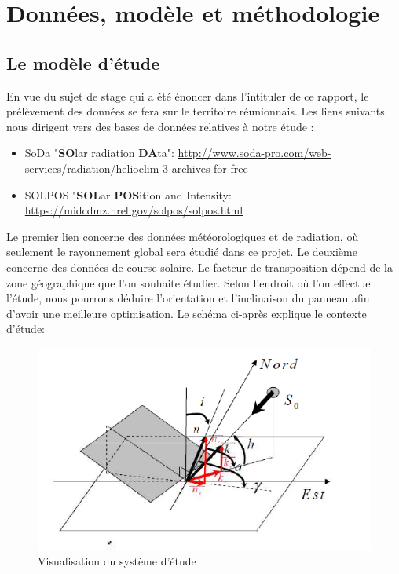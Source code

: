 \documentclass[12pt,a4paper,openright]{report}
\begin{document}
\section{Données, modèle et méthodologie}
\subsection{Le modèle d'étude}

En vue du sujet de stage qui a été énoncer dans l'intituler de ce rapport, le prélèvement des données se fera sur le territoire réunionnais. Les liens suivants nous dirigent vers des bases de données relatives à notre étude :
\begin{itemize}
\item SoDa "\textbf{SO}lar radiation \textbf{DA}ta": \url{http://www.soda-pro.com/web-services/radiation/helioclim-3-archives-for-free}
\item SOLPOS "\textbf{SOL}ar \textbf{POS}ition and Intensity: \url{https://midcdmz.nrel.gov/solpos/solpos.html}
\end{itemize}

\noindent Le premier lien concerne des données météorologiques et de radiation, où seulement le rayonnement global sera étudié dans ce projet. Le deuxième concerne des données de course solaire.
\newpage
Le facteur de transposition dépend de la zone géographique que l'on souhaite étudier. Selon l'endroit où l'on effectue l'étude, nous pourrons déduire l'orientation et l'inclinaison du panneau afin d'avoir une meilleure optimisation. Le schéma ci-après explique le contexte d'étude: 

\begin{figure}[h!]
  \begin{center}
    \includegraphics[scale=0.8]{coursesolaire}
    \caption{Visualisation du système d'étude}
  \end{center}
\end{figure}
\end{document}
